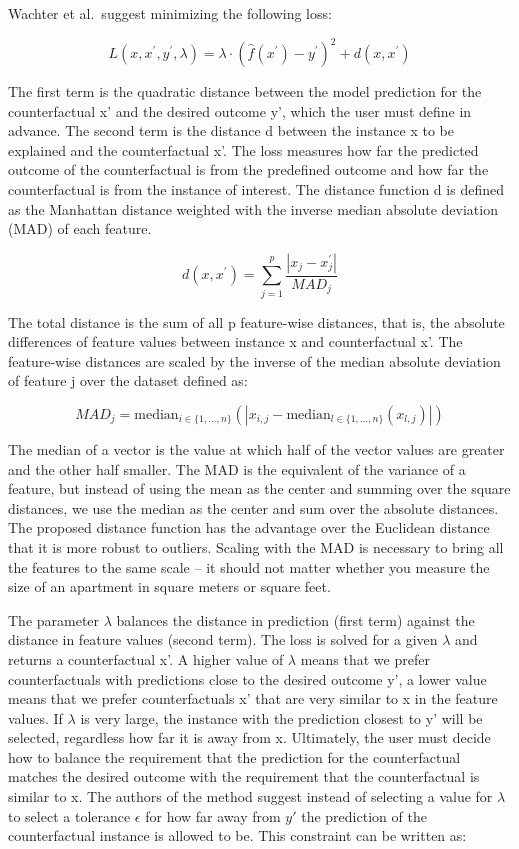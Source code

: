 \documentclass[
  10pt,
]{scrbook}
\begin{document}
Wachter et al.~suggest minimizing the following loss:

\[L(x,x^\prime,y^\prime,\lambda)=\lambda\cdot(\hat{f}(x^\prime)-y^\prime)^2+d(x,x^\prime)\]

The first term is the quadratic distance between the model prediction for the counterfactual x' and the desired outcome y', which the user must define in advance.
The second term is the distance d between the instance x to be explained and the counterfactual x'.
The loss measures how far the predicted outcome of the counterfactual is from the predefined outcome and how far the counterfactual is from the instance of interest.
The distance function d is defined as the Manhattan distance weighted with the inverse median absolute deviation (MAD) of each feature.

\[d(x,x^\prime)=\sum_{j=1}^p\frac{|x_j-x^\prime_j|}{MAD_j}\]

The total distance is the sum of all p feature-wise distances, that is, the absolute differences of feature values between instance x and counterfactual x'.
The feature-wise distances are scaled by the inverse of the median absolute deviation of feature j over the dataset defined as:

\[MAD_j=\text{median}_{i\in{}\{1,\ldots,n\}}(|x_{i,j}-\text{median}_{l\in{}\{1,\ldots,n\}}(x_{l,j})|)\]

The median of a vector is the value at which half of the vector values are greater and the other half smaller.
The MAD is the equivalent of the variance of a feature, but instead of using the mean as the center and summing over the square distances, we use the median as the center and sum over the absolute distances.
The proposed distance function has the advantage over the Euclidean distance that
it is more robust to outliers.
Scaling with the MAD is necessary to bring all the features to the same scale -- it should not matter whether you measure the size of an apartment in square meters or square feet.

The parameter \(\lambda\) balances the distance in prediction (first term) against the distance in feature values (second term).
The loss is solved for a given \(\lambda\) and returns a counterfactual x'.
A higher value of \(\lambda\) means that we prefer counterfactuals with predictions close to the desired outcome y', a lower value means that we prefer counterfactuals x' that are very similar to x in the feature values.
If \(\lambda\) is very large, the instance with the prediction closest to y' will be selected, regardless how far it is away from x.
Ultimately, the user must decide how to balance the requirement that the prediction for the counterfactual matches the desired outcome with the requirement that the counterfactual is similar to x.
The authors of the method suggest instead of selecting a value for \(\lambda\) to select a tolerance \(\epsilon\) for how far away from \(y'\) the prediction of the counterfactual instance is allowed to be.
This constraint can be written as:
\end{document}
